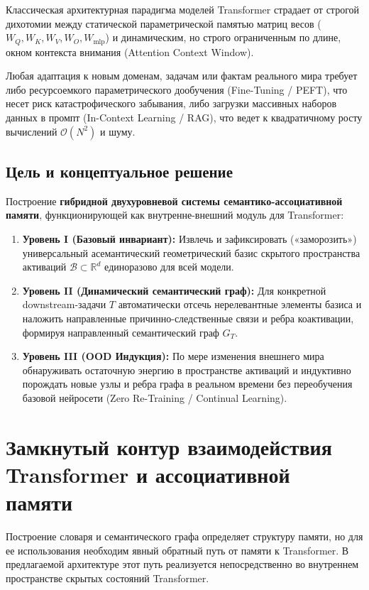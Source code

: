 \documentclass[11pt,a4paper]{article}
\begin{document}
Классическая архитектурная парадигма моделей Transformer страдает от строгой дихотомии между статической параметрической памятью матриц весов ($W_Q, W_K, W_V, W_O, W_{\text{mlp}}$) и динамическим, но строго ограниченным по длине, окном контекста внимания (Attention Context Window).

Любая адаптация к новым доменам, задачам или фактам реального мира требует либо ресурсоемкого параметрического дообучения (Fine-Tuning / PEFT), что несет риск катастрофического забывания, либо загрузки массивных наборов данных в промпт (In-Context Learning / RAG), что ведет к квадратичному росту вычислений $\mathcal{O}(N^2)$ и шуму.

\subsection*{Цель и концептуальное решение}
Построение \textbf{гибридной двухуровневой системы семантико-ассоциативной памяти}, функционирующей как внутренне-внешний модуль для Transformer:
\begin{enumerate}
    \item \textbf{Уровень I (Базовый инвариант):} Извлечь и зафиксировать («заморозить») универсальный асемантический геометрический базис скрытого пространства активаций $\mathcal{B} \subset \mathbb{R}^d$ единоразово для всей модели.
    \item \textbf{Уровень II (Динамический семантический граф):} Для конкретной downstream-задачи $T$ автоматически отсечь нерелевантные элементы базиса и наложить направленные причинно-следственные связи и ребра коактивации, формируя направленный семантический граф $G_T$.
    \item \textbf{Уровень III (OOD Индукция):} По мере изменения внешнего мира обнаруживать остаточную энергию в пространстве активаций и индуктивно порождать новые узлы и ребра графа в реальном времени без переобучения базовой нейросети (Zero Re-Training / Continual Learning).
\end{enumerate}

\section{Замкнутый контур взаимодействия Transformer и ассоциативной памяти}

Построение словаря и семантического графа определяет структуру памяти, но для ее использования необходим явный обратный путь от памяти к Transformer. В предлагаемой архитектуре этот путь реализуется непосредственно во внутреннем пространстве скрытых состояний Transformer.
\end{document}
